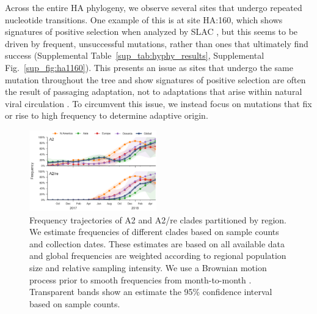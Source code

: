 Across the entire HA phylogeny, we observe several sites that undergo repeated nucleotide transitions.
One example of this is at site HA:160, which shows signatures of positive selection when analyzed by SLAC \citep{pond_2005}, but this seems to be driven by frequent, unsuccessful mutations, rather than ones that ultimately find success (Supplemental Table~\ref{sup_tab:hyphy_results}, Supplemental Fig.~\ref{sup_fig:ha1160}).
This presents an issue as sites that undergo the same mutation throughout the tree and show signatures of positive selection are often the result of passaging adaptation, not to adaptations that arise within natural viral circulation \citep{10.1371/journal.ppat.1004940, McWhite2016SequenceAV}.
To circumvent this issue, we instead focus on mutations that fix or rise to high frequency to determine adaptive origin.

\begin{figure}[b]
    \begin{center}
    \includegraphics[width=0.49\textwidth]{figures/h3n2_freq_mutations.png}
    \end{center}
    \caption{Frequency trajectories of A2 and A2/re clades partitioned by region. We estimate frequencies of different clades based on sample counts and collection dates. These estimates are based on all available data and global frequencies are weighted according to regional population size and relative sampling intensity. We use a Brownian motion process prior to smooth frequencies from month-to-month \citep{neher_nextflu_2015}. Transparent bands show an estimate the 95\% confidence interval based on sample counts.}
    \label{fig:frequencies}
\end{figure}

